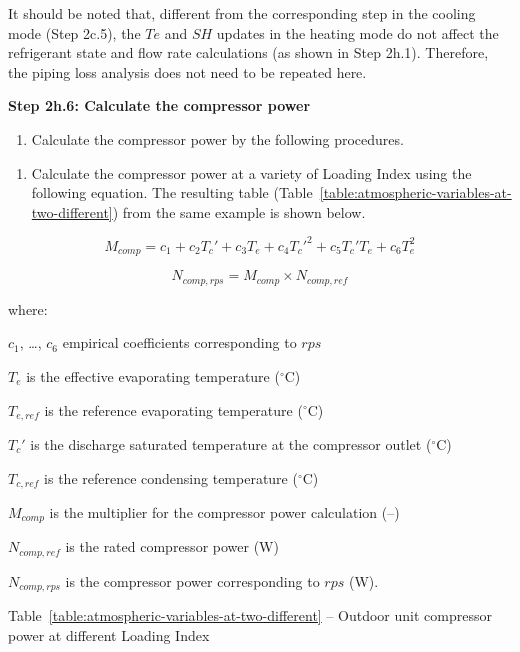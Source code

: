 It should be noted that, different from the corresponding step in the cooling mode (Step 2c.5), the \(Te\) and \(SH\) updates in the heating mode do not affect the refrigerant state and flow rate calculations (as shown in Step 2h.1). Therefore, the piping loss analysis does not need to be repeated here.

\textbf{Step 2h.6: Calculate the compressor power}

\begin{enumerate}
\def\labelenumi{(\arabic{enumi})}
\tightlist
\item
  Calculate the compressor power by the following procedures.
\end{enumerate}

\begin{enumerate}
\def\labelenumi{\alph{enumi}.}
\tightlist
\item
  Calculate the compressor power at a variety of Loading Index using the following equation. The resulting table (Table~\ref{table:atmospheric-variables-at-two-different}) from the same example is shown below.
\end{enumerate}

\begin{equation}
  M_{comp} = c_1+c_2{T_c}'+c_3T_e+c_4{T_c}'^2+c_5{T_c}'T_e+c_6T_e^2
\end{equation}

\begin{equation}
  N_{comp,rps} = M_{comp} \times N_{comp,ref}
\end{equation}

where:

\(c_1\), \ldots{}, \(c_6\) empirical coefficients corresponding to \(rps\)

\(T_e\) is the effective evaporating temperature (\(^{\circ}\)C)

\(T_{e,ref}\) is the reference evaporating temperature (\(^{\circ}\)C)

\({T_c}'\) is the discharge saturated temperature at the compressor outlet (\(^{\circ}\)C)

\(T_{c,ref}\) is the reference condensing temperature (\(^{\circ}\)C)

\(M_{comp}\) is the multiplier for the compressor power calculation (--)

\(N_{comp,ref}\) is the rated compressor power (W)

\(N_{comp,rps}\) is the compressor power corresponding to \(rps\) (W).

Table~\ref{table:atmospheric-variables-at-two-different} -- Outdoor unit compressor power at different Loading Index

